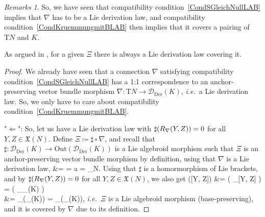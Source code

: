 \documentclass[preprint]{elsarticle}
\def\bas#1\eas{\begin{align*}#1\end{align*}}
\theoremstyle{plain}
\theoremstyle{remark}
\newtheorem{remark}[theorem]{Remarks}
\theoremstyle{definition}
\begin{document}
\begin{remark}\label{remExistenceOfLieDerivationLawsCoveringACoupling}
\leavevmode\newline
So, we have seen that compatibility condition~\eqref{CondSGleichNullLAB} implies that $\nabla$ has to be a Lie derivation law, and compatibility condition~\eqref{CondKruemmungmitBLAB} then implies that it covers a pairing of $\mathrm{T}N$ and $K$.

As argued in \cite[\S 7.2, discussion after Definition 7.2.2, replace the $A$ there with $\mathrm{T}N$; page 272]{mackenzieGeneralTheory}, for a given $\Xi$ there is always a Lie derivation law covering it.
\end{remark}

\begin{proof}
\leavevmode\newline
We already have seen that a connection $\nabla$ satisfying compatibility condition~\eqref{CondSGleichNullLAB} has a 1:1 correspondence to an anchor-preserving vector bundle morphism $\nabla: \mathrm{T}N \to \mathcal{D}_{\mathrm{Der}}(K)$, \textit{i.e.}~a Lie derivation law. So, we only have to care about compatibility condition~\eqref{CondKruemmungmitBLAB}.

"$\Leftarrow$": So, let us have a Lie derivation law with $\sharp\mleft(R_\nabla(Y, Z)\mright) = 0$ for all $Y, Z \in \mathfrak{X}(N)$. Define $\Xi \coloneqq \sharp \circ \nabla$, and recall that $\sharp: \mathcal{D}_{\mathrm{Der}}(K) \to \mathrm{Out}(\mathcal{D}_{\mathrm{Der}}(K))$ is a Lie algebroid morphism such that $\Xi$ is an anchor-preserving vector bundle morphism by definition, using that $\nabla$ is a Lie derivation law,
\bas
\overline{a} \circ \Xi
&=
 \circ \sharp \circ \nabla
=
a \circ \nabla
= _{N}.
\eas
Using that $\sharp$ is a homormorphism of Lie brackets, and by $\sharp\mleft(R_\nabla(Y, Z)\mright) = 0$ for all $Y, Z \in \mathfrak{X}(N)$, we also get
\bas
\Xi([Y, Z])
&=
\sharp \mleft( \nabla_{[Y, Z]} \mright)
=
\sharp \mleft( _{_{}(K)} \mright) \\
&=
_{(_{}(K))}
=
\mleft[ \Xi(Y), \Xi(Z) \mright]_{(_{}(K))},
\eas
\textit{i.e.}~$\Xi$ is a Lie algebroid morphism (base-preserving), and it is covered by $\nabla$ due to its definition.


\end{proof}
\end{document}
